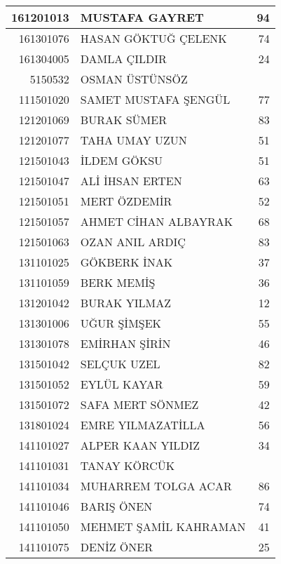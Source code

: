 \documentclass[12pt]{article}
\begin{document}
\begin{multicols}{2}
\begin{longtable}{||r||l||r||}
    \midrule
    161201013 & MUSTAFA GAYRET & 94 \\
    \midrule
    161301076 & HASAN GÖKTUĞ ÇELENK & \cellcolor[rgb]{ 1,  1,  0} 74 \\
    \midrule
    161304005 & DAMLA ÇILDIR & 24 \\
    \midrule
    5150532 & OSMAN ÜSTÜNSÖZ &  \\
    \midrule
    111501020 & SAMET MUSTAFA ŞENGÜL & \cellcolor[rgb]{ 1,  1,  0} 77 \\
    \midrule
    121201069 & BURAK SÜMER & 83 \\
    \midrule
    121201077 & TAHA UMAY UZUN & 51 \\
    \midrule
    121501043 & İLDEM GÖKSU & 51 \\
    \midrule
    121501047 & ALİ İHSAN ERTEN & 63 \\
    \midrule
    121501051 & MERT ÖZDEMİR & 52 \\
    \midrule
    121501057 & AHMET CİHAN ALBAYRAK & \cellcolor[rgb]{ 1,  1,  0} 68 \\
    \midrule
    121501063 & OZAN ANIL ARDIÇ & \cellcolor[rgb]{ 1,  1,  0} 83 \\
    \midrule
    131101025 & GÖKBERK İNAK & 37 \\
    \midrule
    131101059 & BERK MEMİŞ & 36 \\
    \midrule
    131201042 & BURAK YILMAZ & 12 \\
    \midrule
    131301006 & UĞUR ŞİMŞEK & 55 \\
    \midrule
    131301078 & EMİRHAN ŞİRİN & 46 \\
    \midrule
    131501042 & SELÇUK UZEL & 82 \\
    \midrule
    131501052 & EYLÜL KAYAR & 59 \\
    \midrule
    131501072 & SAFA MERT SÖNMEZ & 42 \\
    \midrule
    131801024 & EMRE YILMAZATİLLA & 56 \\
    \midrule
    141101027 & ALPER KAAN YILDIZ & 34 \\
    \midrule
    141101031 & TANAY KÖRCÜK &  \\
    \midrule
    141101034 & MUHARREM TOLGA ACAR & 86 \\
    \midrule
    141101046 & BARIŞ ÖNEN & 74 \\
    \midrule
    141101050 & MEHMET ŞAMİL KAHRAMAN & 41 \\
    \midrule
    141101075 & DENİZ ÖNER & 25 \\
    \midrule

\end{longtable}
\end{multicols}
\end{document}

